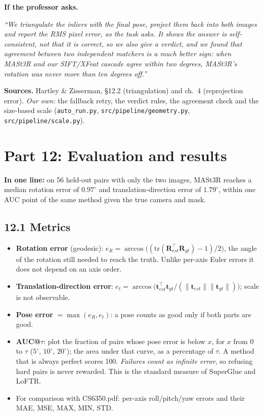 \documentclass[11pt,a4paper]{article}
\newcommand{\R}{\mathbf{R}}
\newcommand{\tv}{\mathbf{t}}
\newenvironment{viva}{\par\medskip\noindent\colorbox{gray!12}{\parbox{\dimexpr\linewidth-2\fboxsep}{\textbf{If the professor asks.}\ }}\par\begingroup\itshape}{\endgroup\par\medskip}
\begin{document}
\begin{viva}
``We triangulate the inliers with the final pose, project them back into both images and report the RMS pixel error, as the task asks. It shows the answer is self-consistent, not that it is correct, so we also give a verdict, and we found that agreement between two independent matchers is a much better sign: when MASt3R and our SIFT/XFeat cascade agree within two degrees, MASt3R's rotation was never more than ten degrees off.''
\end{viva}

\noindent\textbf{Sources.} Hartley \& Zisserman, \S12.2 (triangulation) and ch.~4 (reprojection error). \emph{Our own:} the fallback retry, the verdict rules, the agreement check and the size-based scale (\texttt{auto\_run.py}, \texttt{src/pipeline/geometry.py}, \texttt{src/pipeline/scale.py}).

\section*{Part 12: Evaluation and results}

\textbf{In one line:} on 56 held-out pairs with only the two images, MASt3R reaches a median rotation error of $0.97^\circ$ and translation-direction error of $1.79^\circ$, within one AUC point of the same method given the true camera and mask.

\subsection*{12.1 Metrics}
\begin{itemize}
  \item \textbf{Rotation error} (geodesic): $e_R = \arccos\big((\mathrm{tr}(\R_{est}^\top\R_{gt})-1)/2\big)$, the angle of the rotation still needed to reach the truth. Unlike per-axis Euler errors it does not depend on an axis order.
  \item \textbf{Translation-direction error}: $e_t = \arccos\big(\tv_{est}^\top\tv_{gt}/(\|\tv_{est}\|\|\tv_{gt}\|)\big)$; scale is not observable.
  \item \textbf{Pose error} $=\max(e_R, e_t)$: a pose counts as good only if both parts are good.
  \item \textbf{AUC@$\tau$}: plot the fraction of pairs whose pose error is below $x$, for $x$ from 0 to $\tau$ ($5^\circ$, $10^\circ$, $20^\circ$); the area under that curve, as a percentage of $\tau$. A method that is always perfect scores 100. \emph{Failures count as infinite error}, so refusing hard pairs is never rewarded. This is the standard measure of SuperGlue and LoFTR.
  \item For comparison with CS6350.pdf: per-axis roll/pitch/yaw errors and their MAE, MSE, MAX, MIN, STD.
\end{itemize}
\end{document}
